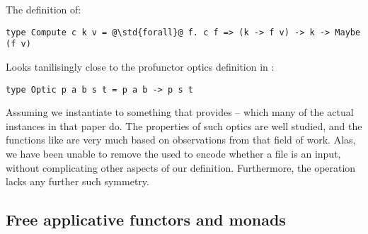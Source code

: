 The  definition of:

\begin{verbatim}
type Compute c k v = @\std{forall}@ f. c f => (k -> f v) -> k -> Maybe (f v)
\end{verbatim}

Looks tanilisingly close to the profunctor optics definition in \cite{gibbons-profunctor-optics}:

\begin{verbatim}
type Optic p a b s t = p a b -> p s t
\end{verbatim}

Assuming we instantiate  to something that provides  -- which many of the actual instances in that paper do. The properties of such optics are well studied, and the functions like  are very much based on observations from that field of work. Alas, we have been unable to remove the  used to encode whether a file is an input, without complicating other aspects of our definition. Furthermore, the  operation lacks any further such symmetry.

\subsection{Free applicative functors and monads}\label{sec-related-free}

